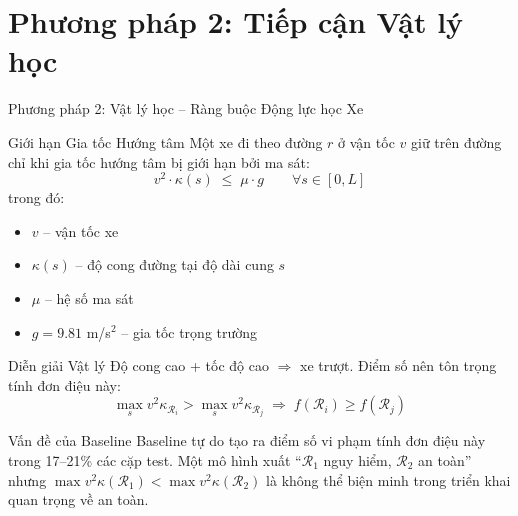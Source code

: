 \documentclass[aspectratio=169,10pt]{beamer}
\begin{document}
\section{Phương pháp 2: Tiếp cận Vật lý học}

\begin{frame}{Phương pháp 2: Vật lý học -- Ràng buộc Động lực học Xe}
\begin{block}{Giới hạn Gia tốc Hướng tâm}
\scriptsize
Một xe đi theo đường $r$ ở vận tốc $v$ giữ trên đường chỉ khi gia tốc hướng tâm bị giới hạn bởi ma sát:
\[
\boxed{v^2 \cdot \kappa(s) \;\le\; \mu \cdot g \qquad \forall s \in [0, L]}
\]
trong đó:
\begin{itemize}
  \item $v$ -- vận tốc xe
  \item $\kappa(s)$ -- độ cong đường tại độ dài cung $s$
  \item $\mu$ -- hệ số ma sát
  \item $g = 9.81$ m/s$^2$ -- gia tốc trọng trường
\end{itemize}
\end{block}

\begin{block}{Diễn giải Vật lý}
\scriptsize
Độ cong cao + tốc độ cao $\Rightarrow$ xe trượt. Điểm số nên tôn trọng tính đơn điệu này:
\[
\max_s v^2\kappa_{\mathcal{R}_i} > \max_s v^2\kappa_{\mathcal{R}_j} \;\Longrightarrow\; f(\mathcal{R}_i) \ge f(\mathcal{R}_j)
\]
\end{block}

\begin{alertblock}{Vấn đề của Baseline}
\scriptsize
Baseline tự do tạo ra điểm số \alert{vi phạm tính đơn điệu này trong 17--21\% các cặp test}. Một mô hình xuất ``$\mathcal{R}_1$ nguy hiểm, $\mathcal{R}_2$ an toàn'' nhưng $\max v^2\kappa(\mathcal{R}_1) < \max v^2\kappa(\mathcal{R}_2)$ là \alert{không thể biện minh} trong triển khai quan trọng về an toàn.
\end{alertblock}
\end{frame}
\end{document}
